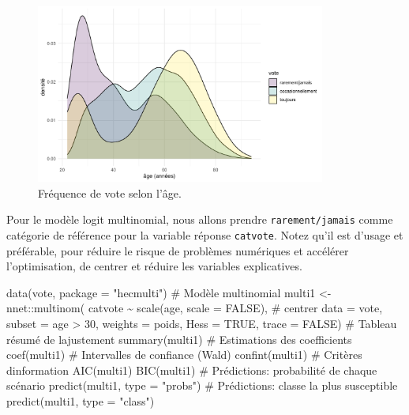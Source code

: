 \documentclass[
  11pt,
  letterpaper,
]{scrbook}
\newenvironment{Shaded}{\begin{snugshade}}{\end{snugshade}}
\newcommand{\AttributeTok}[1]{\textcolor[rgb]{0.40,0.45,0.13}{#1}}
\newcommand{\CommentTok}[1]{\textcolor[rgb]{0.37,0.37,0.37}{#1}}
\newcommand{\ConstantTok}[1]{\textcolor[rgb]{0.56,0.35,0.01}{#1}}
\newcommand{\DecValTok}[1]{\textcolor[rgb]{0.68,0.00,0.00}{#1}}
\newcommand{\FunctionTok}[1]{\textcolor[rgb]{0.28,0.35,0.67}{#1}}
\newcommand{\NormalTok}[1]{\textcolor[rgb]{0.00,0.23,0.31}{#1}}
\newcommand{\OtherTok}[1]{\textcolor[rgb]{0.00,0.23,0.31}{#1}}
\newcommand{\SpecialCharTok}[1]{\textcolor[rgb]{0.37,0.37,0.37}{#1}}
\newcommand{\StringTok}[1]{\textcolor[rgb]{0.13,0.47,0.30}{#1}}
\theoremstyle{definition}
\theoremstyle{remark}
\begin{document}
\begin{figure}[ht!]

{\centering \includegraphics[width=0.85\textwidth,height=\textheight]{./05-reglogistique_files/figure-pdf/fig-vote-age-1.pdf}

}

\caption{\label{fig-vote-age}Fréquence de vote selon l'âge.}

\end{figure}

Pour le modèle logit multinomial, nous allons prendre
\texttt{rarement/jamais} comme catégorie de référence pour la variable
réponse \texttt{catvote}. Notez qu'il est d'usage et préférable, pour
réduire le risque de problèmes numériques et accélérer l'optimisation,
de centrer et réduire les variables explicatives.

\begin{Shaded}
\begin{Highlighting}[]
\FunctionTok{data}\NormalTok{(vote, }\AttributeTok{package =} \StringTok{"hecmulti"}\NormalTok{)}
\CommentTok{\# Modèle multinomial}
\NormalTok{multi1 }\OtherTok{\textless{}{-}}\NormalTok{ nnet}\SpecialCharTok{::}\FunctionTok{multinom}\NormalTok{(}
\NormalTok{  catvote }\SpecialCharTok{\textasciitilde{}} \FunctionTok{scale}\NormalTok{(age, }\AttributeTok{scale =} \ConstantTok{FALSE}\NormalTok{), }\CommentTok{\# centrer}
  \AttributeTok{data =}\NormalTok{ vote, }
  \AttributeTok{subset =}\NormalTok{ age }\SpecialCharTok{\textgreater{}} \DecValTok{30}\NormalTok{,}
  \AttributeTok{weights =}\NormalTok{ poids,}
  \AttributeTok{Hess =} \ConstantTok{TRUE}\NormalTok{,}
  \AttributeTok{trace =} \ConstantTok{FALSE}\NormalTok{) }
\CommentTok{\# Tableau résumé de l\textquotesingle{}ajustement}
\FunctionTok{summary}\NormalTok{(multi1)}
\CommentTok{\# Estimations des coefficients}
\FunctionTok{coef}\NormalTok{(multi1)}
\CommentTok{\# Intervalles de confiance (Wald)}
\FunctionTok{confint}\NormalTok{(multi1)}
\CommentTok{\# Critères d\textquotesingle{}information}
\FunctionTok{AIC}\NormalTok{(multi1)}
\FunctionTok{BIC}\NormalTok{(multi1)}
\CommentTok{\# Prédictions: probabilité de chaque scénario}
\FunctionTok{predict}\NormalTok{(multi1, }\AttributeTok{type =} \StringTok{"probs"}\NormalTok{)}
\CommentTok{\# Prédictions: classe la plus susceptible}
\FunctionTok{predict}\NormalTok{(multi1, }\AttributeTok{type =} \StringTok{"class"}\NormalTok{)}
\end{Highlighting}
\end{Shaded}
\end{document}
